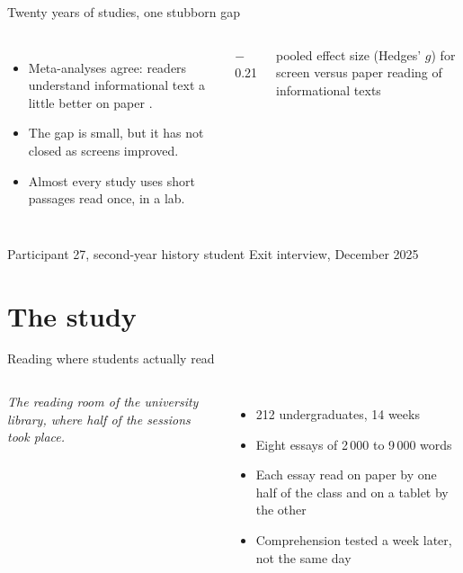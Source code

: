 \documentclass[aspectratio=169,11pt,t]{beamer}
\begin{document}
\begin{frame}{Twenty years of studies, one stubborn gap}
  \begin{columns}[T,onlytextwidth]
      \begin{itemize}
        \item Meta-analyses agree: readers understand informational text a little
              better on paper \parencite{delgado2018,clinton2019}.
        \item The gap is small, but it has not closed as screens improved.
        \item Almost every study uses short passages read once, in a lab.
      \end{itemize}
      \vspace{1mm}
      {\color{mnAccent}$-$0.21\par}
      \vspace{2mm}{\color{mnRule}\rule{\linewidth}{0.4pt}}\par\vspace{2mm}
      {\small\color{mnMuted}pooled effect size (Hedges' $g$) for screen versus paper
      reading of informational texts \parencite{delgado2018}\par}
  \end{columns}
\end{frame}

  {Participant 27, second-year history student}
  {Exit interview, December 2025}

\section{The study}

\begin{frame}{Reading where students actually read}
  \begin{columns}[T,onlytextwidth]
      \par\vspace{2mm}
      {\footnotesize\rmfamily\itshape\color{mnMuted}The reading room of the university
      library, where half of the sessions took place.\par}
      \begin{itemize}
        \item 212 undergraduates, 14 weeks
        \item Eight essays of 2\,000 to 9\,000 words
        \item Each essay read on paper by one half of the class and on a tablet by the other
        \item Comprehension tested a week later, not the same day
      \end{itemize}
  \end{columns}
\end{frame}
\end{document}
